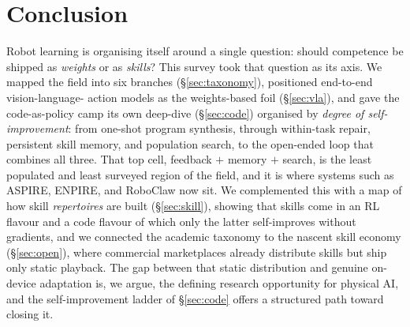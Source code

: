 \section{Conclusion}
\label{sec:conclusion}

Robot learning is organising itself around a single question: should competence be shipped
as \emph{weights} or as \emph{skills}? This survey took that question as its axis. We mapped
the field into six branches (\S\ref{sec:taxonomy}), positioned end-to-end vision-language-
action models as the weights-based foil (\S\ref{sec:vla}), and gave the code-as-policy camp
its own deep-dive (\S\ref{sec:code}) organised by \emph{degree of self-improvement}: from
one-shot program synthesis, through within-task repair, persistent skill memory, and
population search, to the open-ended loop that combines all three. That top cell, feedback
$+$ memory $+$ search, is the least populated and least surveyed region of the field, and
it is where systems such as ASPIRE, ENPIRE, and RoboClaw now sit. We complemented this with a map of
how skill \emph{repertoires} are built (\S\ref{sec:skill}), showing that skills come in an
RL flavour and a code flavour of which only the latter self-improves without gradients, and
we connected the academic taxonomy to the nascent skill economy (\S\ref{sec:open}), where
commercial marketplaces already distribute skills but ship only static playback. The gap
between that static distribution and genuine on-device adaptation is, we argue, the defining
research opportunity for physical AI, and the self-improvement ladder of \S\ref{sec:code} offers a structured path toward closing it.
